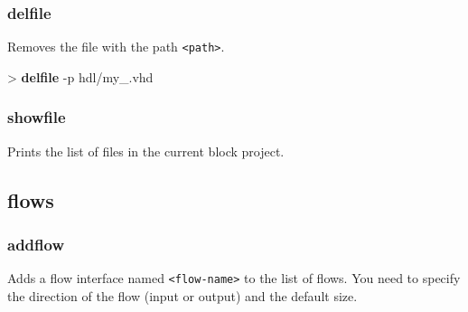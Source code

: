 \documentclass[10pt,a4paper]{article}
\begin{document}

\subsubsection{delfile}
\label{subsec:delfile}

Removes the file with the path \texttt{<path>}.\\


\begin{sampletitle}
> \textbf{\tool{} delfile} -p hdl/my\_\kind{}.vhd
\end{sampletitle}


\subsubsection{showfile}
\label{subsec:showfile}

Prints the list of files in the current block project.

\subsection{flows}
\subsubsection{addflow}
\label{subsec:addflow}

Adds a flow interface named \texttt{<flow-name>} to the list of flows. You need to specify the direction of the flow (input or output) and the default size.\\

\end{document}
